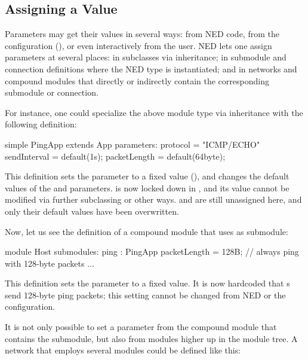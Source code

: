 \subsection{Assigning a Value}
\label{sec:ned-lang:parameter-assignments}

Parameters may get their values in several ways: from NED code, from the
configuration (), or even interactively from the user.
NED lets one assign parameters at several places: in subclasses via inheritance;
in submodule and connection definitions where the NED type is instantiated; and
in networks and compound modules that directly or indirectly contain the
corresponding submodule or connection.

For instance, one could specialize the above  module type via
inheritance with the following definition:

\begin{ned}
simple PingApp extends App
{
    parameters:
        protocol = "ICMP/ECHO"
        sendInterval = default(1s);
        packetLength = default(64byte);
}
\end{ned}

This definition sets the  parameter to a fixed value
(), and changes the default values of the 
and  parameters.  is now locked down in
, and its value cannot be modified via further subclassing or other
ways.  and  are still unassigned here, and
only their default values have been overwritten.

Now, let us see the definition of a  compound module that uses
 as submodule:

\begin{ned}
module Host
{
    submodules:
        ping : PingApp {
            packetLength = 128B; // always ping with 128-byte packets
        }
        ...
}
\end{ned}

This definition sets the  parameter to a fixed value. It is
now hardcoded that s send 128-byte ping packets; this setting cannot
be changed from NED or the configuration.

It is not only possible to set a parameter from the compound module that
contains the submodule, but also from modules higher up in the module tree. A
network that employs several  modules could be defined like this:

